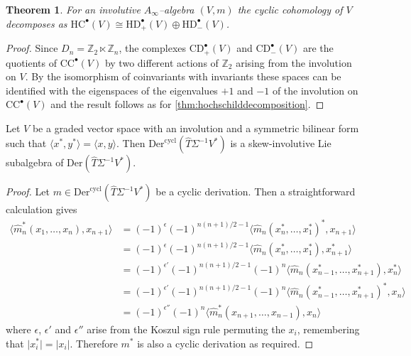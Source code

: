 \documentclass[british]{amsart}
\theoremstyle{plain}
\newtheorem{theorem}{Theorem}[section]
\theoremstyle{definition}
{
\newaliascnt{{definition}}{theorem}\newtheorem{{definition}}[{definition}]{{Definition}}\aliascntresetthe{{definition}}\expandafterautorefname\endcsname{{Definition}}}
{
\newaliascnt{{remark}}{theorem}\newtheorem{{remark}}[{remark}]{{Remark}}\aliascntresetthe{{remark}}\expandafterautorefname\endcsname{{Remark}}}
{
\newaliascnt{{example}}{theorem}\newtheorem{{example}}[{example}]{{Example}}\aliascntresetthe{{example}}\expandafterautorefname\endcsname{{Example}}}
{
\newaliascnt{{examples}}{theorem}\newtheorem{{examples}}[{examples}]{{Examples}}\aliascntresetthe{{examples}}\expandafterautorefname\endcsname{{Examples}}}
{
\newaliascnt{{notation}}{theorem}\newtheorem{{notation}}[{notation}]{{Notation}}\aliascntresetthe{{notation}}\expandafterautorefname\endcsname{{Notation}}}
{
\newaliascnt{{convention}}{theorem}\newtheorem{{convention}}[{convention}]{{Convention}}\aliascntresetthe{{convention}}\expandafterautorefname\endcsname{{Convention}}}
\numberwithin{equation}{section}
\numberwithin{figure}{section}
\begin{document}
\begin{theorem}\label{thm:cyclicdecomposition}
For an involutive $A_\infty$--algebra $(V, m)$ the cyclic cohomology of $V$ decomposes as ${\mathrm{HC}}^\bullet(V) \cong {\mathrm{HD}}^\bullet_+(V) \oplus {\mathrm{HD}}^\bullet_-(V)$.
\end{theorem}

\begin{proof}
Since $D_n = \mathbb{Z}_2\ltimes \mathbb{Z}_n$, the complexes ${\mathrm{CD}}^\bullet_+(V)$ and ${\mathrm{CD}}^\bullet_-(V)$ are the quotients of ${\mathrm{CC}}^\bullet(V)$ by two different actions of $\mathbb{Z}_2$ arising from the involution on $V$. By the isomorphism of coinvariants with invariants these spaces can be identified with the eigenspaces of the eigenvalues $+1$ and $-1$ of the involution on ${\mathrm{CC}}^\bullet(V)$ and the result follows as for \autoref{thm:hochschilddecomposition}.
\end{proof}

\begin{proposition}
Let $V$ be a graded vector space with an involution and a symmetric bilinear form such that $\langle x^*, y^* \rangle = \langle x, y \rangle$. Then ${\mathrm{Der}}^{\mathrm{cycl}}(\widehat{T}\Sigma^{-1} V^*)$ is a skew-involutive Lie subalgebra of ${\mathrm{Der}}(\widehat{T}\Sigma^{-1} V^*)$.
\end{proposition}

\begin{proof}
Let $m\in {\mathrm{Der}}^{\mathrm{cycl}}(\widehat{T}\Sigma^{-1} V^*)$ be a cyclic derivation. Then a straightforward calculation gives
\begin{align*}
\langle \hat{m}^*_n(x_1,\dots , x_n), x_{n+1} \rangle &= (-1)^{\epsilon}(-1)^{n(n+1)/2 - 1} \langle \hat{m}_n(x_n^*,\dots,x_1^*)^*, x_{n+1} \rangle
\\
&= (-1)^{\epsilon}(-1)^{n(n+1)/2 - 1} \langle \hat{m}_n(x_n^*,\dots,x_1^*), x_{n+1}^* \rangle
\\
&=  (-1)^{\epsilon'}(-1)^{n(n+1)/2 - 1}(-1)^n \langle \hat{m}_n(x_{n-1}^*,\dots, x_{n+1}^*), x_n^* \rangle
\\
&= (-1)^{\epsilon'}(-1)^{n(n+1)/2 - 1}(-1)^n \langle \hat{m}_n(x_{n-1}^*,\dots, x_{n+1}^*)^*, x_n \rangle
\\
&= (-1)^{\epsilon''}(-1)^n \langle \hat{m}_n^*(x_{n+1},\dots, x_{n-1}), x_n \rangle
\end{align*}
where $\epsilon$, $\epsilon'$ and $\epsilon''$ arise from the Koszul sign rule permuting the $x_i$, remembering that ${\lvert {x_i^*} \rvert} = {\lvert {x_i} \rvert}$. Therefore $m^*$ is also a cyclic derivation as required. 
\end{proof}
\end{document}
